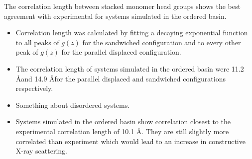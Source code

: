 \documentclass{article}
\begin{document}
  
  The correlation length between stacked monomer head groups shows the best agreement with
  experimental for systems simulated in the ordered basin.
  \begin{itemize}
  		\item Correlation length was calculated by fitting a decaying exponential function
  		to all peaks of $g(z)$ for the sandwiched configuration and to every other peak of
  		$g(z)$ for the parallel displaced configuration. 
  		\item The correlation length of systems simulated in the ordered basin were 11.2 \AA and 
  		14.9 \AA  		for the parallel displaced and sandwiched configurations respectively. 
  		\item Something about disordered systems.
  		\item Systems simulated in the ordered basin show correlation closest to the experimental 
  		correlation length of 10.1 \AA. They are still slightly more correlated than 
  		experiment which would lead to an increase in constructive X-ray scattering. 
  \end{itemize}  
  
\end{document}
